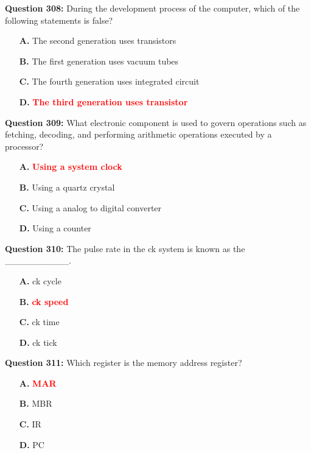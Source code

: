 \documentclass[12pt,a4paper]{article}
\begin{document}
\vspace{0.5cm}

\textbf{Question 308:} During the development process of the computer, which of the following statements is false?

\begin{itemize}
    \item[\textbf{A.}] The second generation uses transistors
    \item[\textbf{B.}] The first generation uses vacuum tubes
    \item[\textbf{C.}] The fourth generation uses integrated circuit
    \item[\textbf{D.}] \textcolor{red}{\textbf{The third generation uses transistor}}
\end{itemize}

\vspace{0.5cm}

\textbf{Question 309:} What electronic component is used to govern operations such as fetching, decoding, and performing arithmetic operations executed by a processor?

\begin{itemize}
    \item[\textbf{A.}] \textcolor{red}{\textbf{Using a system clock}}
    \item[\textbf{B.}] Using a quartz crystal
    \item[\textbf{C.}] Using a analog to digital converter
    \item[\textbf{D.}] Using a counter
\end{itemize}

\vspace{0.5cm}

\textbf{Question 310:} The pulse rate in the ck system is known as the __________.

\begin{itemize}
    \item[\textbf{A.}] ck cycle
    \item[\textbf{B.}] \textcolor{red}{\textbf{ck speed}}
    \item[\textbf{C.}] ck time
    \item[\textbf{D.}] ck tick
\end{itemize}

\vspace{0.5cm}

\textbf{Question 311:} Which register is the memory address register?

\begin{itemize}
    \item[\textbf{A.}] \textcolor{red}{\textbf{MAR}}
    \item[\textbf{B.}] MBR
    \item[\textbf{C.}] IR
    \item[\textbf{D.}] PC
\end{itemize}
\end{document}
